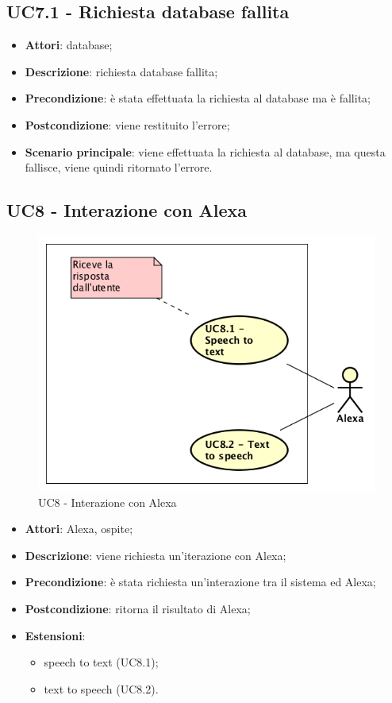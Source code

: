 \documentclass[../AnalisiDeiRequisiti.tex]{subfiles}
\begin{document}
\subsection{UC7.1 - Richiesta database fallita} 
\label{sssec:UC7.1} 
\begin{itemize} 
\item \textbf{Attori}: database;
\item \textbf{Descrizione}: richiesta database fallita;
\item \textbf{Precondizione}: è stata effettuata la richiesta al database ma è fallita;
\item \textbf{Postcondizione}: viene restituito l'errore;
\item \textbf{Scenario principale}: viene effettuata la richiesta al database, ma questa fallisce, viene quindi ritornato l'errore.\end{itemize} 
\newpage
\subsection{UC8 - Interazione con Alexa}
\begin{figure}[!h]
	\centering
	\includegraphics[width=\textwidth]{UseCases/UC8-InterazioneAlexa/UC8.png}
	\caption{UC8 - Interazione con Alexa}
\end{figure}
\label{sssec:UC8} 
\begin{itemize} 
\item \textbf{Attori}: Alexa, ospite;
\item \textbf{Descrizione}: viene richiesta un'iterazione con Alexa;
\item \textbf{Precondizione}: è stata richiesta un'interazione tra il sistema ed Alexa;
\item \textbf{Postcondizione}: ritorna il risultato di Alexa;
\item \textbf{Estensioni}:\begin{itemize}\item speech to text (UC8.1);\item text to speech (UC8.2).\end{itemize}
\end{itemize} 
\end{document}
